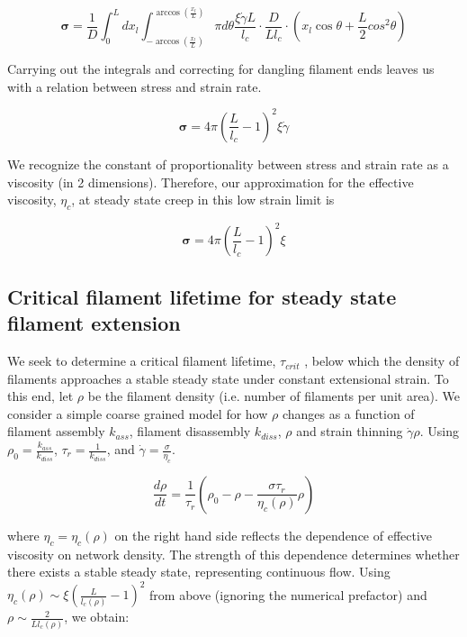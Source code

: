\begin{equation}
	\mathbf{\sigma} =  \frac{1}{D} \int_0^L dx_l \int_{-\arccos (\frac{x_l}{L})}^{\arccos (\frac{x_l}{L})}\pi d\theta \frac{\xi \dot \gamma L}{l_c} \cdot \frac{D}{Ll_c}\cdot (x_l \cos \theta + \frac{L}{2} cos^2\theta)
\end{equation}

Carrying out the integrals and correcting for dangling filament ends leaves us with a relation between stress and strain rate.

\begin{equation}
	\mathbf{\sigma} = 4 \pi \left ( \frac{ L}{l_c}-1 \right)^2 \xi \dot \gamma 
\end{equation}

We recognize the constant of proportionality between stress and strain rate as a viscosity (in 2 dimensions).  Therefore, our approximation for the effective viscosity, $\eta_{c}$, at steady state creep in this low strain limit is

\begin{equation}
	\label{lin_eqn}
	\mathbf{\sigma} = 4 \pi \left ( \frac{ L}{l_c}-1 \right)^2 \xi
\end{equation}



\subsection{Critical filament lifetime for steady state filament extension}
We seek to determine a critical filament lifetime, $\tau_{crit}$ , below which the density of filaments approaches a stable steady state under constant extensional strain. To this end, let $\rho$ be the filament density (i.e. number of filaments per unit area). We consider a simple coarse grained model for how $\rho$ changes as a function of filament assembly $k_{ass}$, filament disassembly $k_{diss}$, $\rho$ and strain thinning $\dot{\gamma}\rho$. Using $\rho_0 = \frac{k_{ass}}{k_{diss}}$, $\tau_r=\frac{1}{k_{diss}}$, and $\dot{\gamma}=\frac{\sigma}{\eta_c}$.

\begin{equation}
	\label{drho_1}
	\frac{d\rho}{dt}=\frac{1}{\tau_r}\left ( \rho_0 - \rho - \frac{\sigma \tau_r}{\eta_c(\rho)} \rho\right )
\end{equation}

where $\eta_c = \eta_c(\rho)$ on the right hand side reflects the dependence of effective viscosity on network density.  The strength of this dependence determines whether there exists a stable steady state, representing continuous flow.  Using $\eta_c(\rho)\sim \xi \left ( \frac{L}{l_c(\rho)} -1 \right )^2$ from above (ignoring the numerical prefactor) and $\rho \sim \frac{2}{L l_c(\rho)}$, we obtain:


